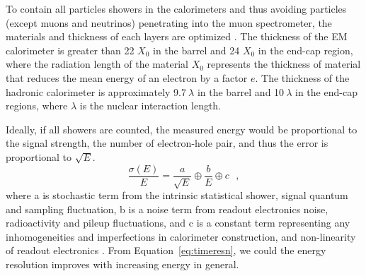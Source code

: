 \par To contain all particles showers in the calorimeters and thus avoiding particles (except muons and neutrinos) penetrating into the muon spectrometer, the materials and 
thickness of each layers are optimized \cite{Aad:1129811}. The thickness of the EM calorimeter is greater than 22 $X_0$ in the barrel and 24 $X_0$ in 
the end-cap region, where the radiation length of the material $X_0$ represents the thickness of material that reduces the mean energy of an electron 
by a factor $e$. The thickness of the hadronic calorimeter is approximately 9.7$~\lambda$ in the barrel and 10$~\lambda$ in the end-cap regions, where $\lambda$ is the nuclear interaction length.
\par Ideally, if all showers are counted, the measured energy would be proportional to the signal strength, the number of electron-hole pair, and thus the error is proportional to $\sqrt{E}$. 
\begin{equation}
\label{eq:timeresn}
\frac{\sigma(E)}{E} = \frac{a}{\sqrt{E}} \oplus \frac{b}{E} \oplus c \ \ \  ,
\end{equation}
where a is stochastic term from the intrinsic statistical shower, signal quantum and sampling fluctuation, b is a noise term from readout electronics noise, radioactivity and pileup fluctuations, and c is a constant term representing any inhomogeneities and imperfections in calorimeter construction, and non-linearity of readout electronics \cite{calorimetry}. From Equation~\ref{eq:timeresn}, we could the energy resolution improves with increasing energy in general.






